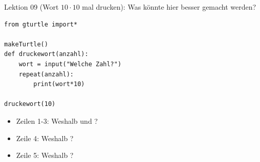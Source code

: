\begin{frame}[fragile]{Lektion 09}
 (Wort $10\cdot 10$ mal drucken): Was könnte hier besser gemacht werden?
\begin{lstlisting}
from gturtle import*

makeTurtle()
def druckewort(anzahl):
    wort = input("Welche Zahl?")
    repeat(anzahl):
        print(wort*10)
        
druckewort(10)
\end{lstlisting}
\begin{itemize}
    \item Zeilen 1-3: Weshalb  und ?
    \item Zeile 4: Weshalb ?
    \item Zeile 5: Weshalb ?
\end{itemize}
\end{frame}


